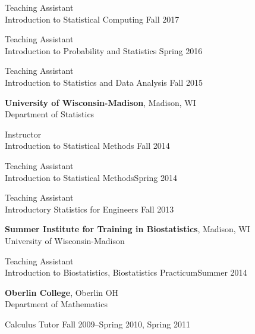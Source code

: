 \documentclass[letterpaper, 11pt]{article}
\begin{document}
\hspace{15pt}Teaching Assistant\\
\hspace{15pt}%
Introduction to Statistical Computing \hfill Fall 2017

\hspace{15pt}Teaching Assistant\\
\hspace{15pt}%
Introduction to Probability and Statistics \hfill Spring 2016

\hspace{15pt}Teaching Assistant\\
\hspace{15pt}%
Introduction to Statistics and Data Analysis \hfill Fall 2015

\vspace{6pt}
{\bf University of Wisconsin-Madison}, Madison, WI\\
Department of Statistics

\hspace{15pt}Instructor\\
\hspace{15pt}%
Introduction to Statistical Methods \hfill Fall 2014

\hspace{15pt}Teaching Assistant\\
\hspace{15pt}%
Introduction to Statistical Methods\hfill Spring 2014

\hspace{15pt}Teaching Assistant\\
\hspace{15pt}%
Introductory Statistics for Engineers \hfill Fall 2013

\vspace{6pt}
{\bf Summer Institute for Training in Biostatistics}, Madison, WI\\
University of Wisconsin-Madison

\hspace{15pt}Teaching Assistant\\
\hspace{15pt}Introduction to Biostatistics, Biostatistics Practicum\hfill Summer 2014

\vspace{6pt}
{\bf Oberlin College}, Oberlin OH\\
Department of Mathematics

\hspace{15pt}Calculus Tutor \hfill Fall 2009--Spring 2010, Spring 2011
\end{document}
